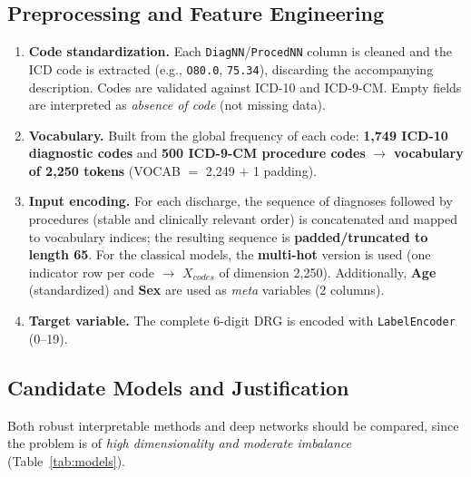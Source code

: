 \documentclass{ieeeaccess}
\begin{document}
\subsection{Preprocessing and Feature Engineering}
\label{sec:preprocessing}
\begin{enumerate}
  \item \textbf{Code standardization.} Each \texttt{DiagNN}/\texttt{ProcedNN} column is cleaned and the ICD code is extracted (e.g., \texttt{O80.0}, \texttt{75.34}), discarding the accompanying description. Codes are validated against ICD-10 and ICD-9-CM. Empty fields are interpreted as \emph{absence of code} (not missing data).
  \item \textbf{Vocabulary.} Built from the global frequency of each code: \textbf{1,749 ICD-10 diagnostic codes} and \textbf{500 ICD-9-CM procedure codes} $\rightarrow$ \textbf{vocabulary of 2,250 tokens} (VOCAB $=$ 2,249 $+$ 1 padding).
  \item \textbf{Input encoding.} For each discharge, the sequence of diagnoses followed by procedures (stable and clinically relevant order) is concatenated and mapped to vocabulary indices; the resulting sequence is \textbf{padded/truncated to length 65}. For the classical models, the \textbf{multi-hot} version is used (one indicator row per code $\rightarrow$ $X_{codes}$ of dimension 2,250). Additionally, \textbf{Age} (standardized) and \textbf{Sex} are used as \emph{meta} variables (2 columns).
  \item \textbf{Target variable.} The complete 6-digit DRG is encoded with \texttt{LabelEncoder} (0--19).
\end{enumerate}

\subsection{Candidate Models and Justification}
\label{sec:models}
Both robust interpretable methods and deep networks should be compared, since the problem is of \emph{high dimensionality and moderate imbalance} (Table~\ref{tab:models}).
\end{document}
